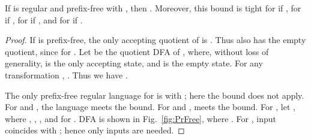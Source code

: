 \documentclass{llncs}
\begin{document}
\begin{theorem}
\label{thm:prefix-free}
If  is regular and prefix-free with , then . Moreover, this bound is tight 
for   if , for   if , for  if , and for 
if .
\end{theorem}
\begin{proof}
If  is prefix-free, the only accepting quotient of  is . Thus  also has the empty quotient, since  for  . 
Let  be the quotient DFA of , where, without loss of generality,   is the only accepting state, and   is the empty state. For any transformation , . Thus we have .

The only prefix-free regular language for  is  with ; here the bound  does not apply. 
For  and , the language  meets the bound.
For  and ,   meets the bound.
For , let , where , , , and  for .
DFA  is shown in Fig.~\ref{fig:PrFree}, 
where .
For ,  input  coincides with ; hence only  inputs are needed. 


\end{proof}
\end{document}
